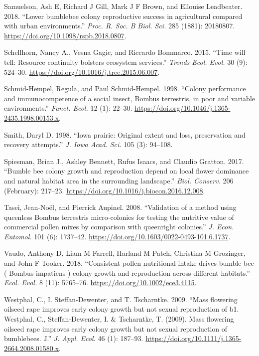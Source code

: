\documentclass[11pt,]{article}
\begin{document}
\leavevmode\hypertarget{ref-Samuelson2018}{}%
Samuelson, Ash E, Richard J Gill, Mark J F Brown, and Ellouise
Leadbeater. 2018. ``Lower bumblebee colony reproductive success in
agricultural compared with urban environments.'' \emph{Proc. R. Soc. B
Biol. Sci.} 285 (1881): 20180807.
\url{https://doi.org/10.1098/rspb.2018.0807}.

\leavevmode\hypertarget{ref-Schellhorn2015c}{}%
Schellhorn, Nancy A., Vesna Gagic, and Riccardo Bommarco. 2015. ``Time
will tell: Resource continuity bolsters ecosystem services.''
\emph{Trends Ecol. Evol.} 30 (9): 524--30.
\url{https://doi.org/10.1016/j.tree.2015.06.007}.

\leavevmode\hypertarget{ref-Schmid-Hempel1998a}{}%
Schmid-Hempel, Regula, and Paul Schmid-Hempel. 1998. ``Colony
performance and immunocompetence of a social insect, Bombus terrestris,
in poor and variable environments.'' \emph{Funct. Ecol.} 12 (1): 22--30.
\url{https://doi.org/10.1046/j.1365-2435.1998.00153.x}.

\leavevmode\hypertarget{ref-Smith1998}{}%
Smith, Daryl D. 1998. ``Iowa prairie: Original extent and loss,
preservation and recovery attempts.'' \emph{J. Iowa Acad. Sci.} 105 (3):
94--108.

\leavevmode\hypertarget{ref-Spiesman2017}{}%
Spiesman, Brian J., Ashley Bennett, Rufus Isaacs, and Claudio Gratton.
2017. ``Bumble bee colony growth and reproduction depend on local flower
dominance and natural habitat area in the surrounding landscape.''
\emph{Biol. Conserv.} 206 (February): 217--23.
\url{https://doi.org/10.1016/j.biocon.2016.12.008}.

\leavevmode\hypertarget{ref-Tasei2008}{}%
Tasei, Jean-Noël, and Pierrick Aupinel. 2008. ``Validation of a method
using queenless Bombus terrestris micro-colonies for testing the
nutritive value of commercial pollen mixes by comparison with queenright
colonies.'' \emph{J. Econ. Entomol.} 101 (6): 1737--42.
\url{https://doi.org/10.1603/0022-0493-101.6.1737}.

\leavevmode\hypertarget{ref-Vaudo2018}{}%
Vaudo, Anthony D, Liam M Farrell, Harland M Patch, Christina M
Grozinger, and John F Tooker. 2018. ``Consistent pollen nutritional
intake drives bumble bee ( Bombus impatiens ) colony growth and
reproduction across different habitats.'' \emph{Ecol. Evol.} 8 (11):
5765--76. \url{https://doi.org/10.1002/ece3.4115}.

\leavevmode\hypertarget{ref-Westphal2009a}{}%
Westphal, C., I. Steffan-Dewenter, and T. Tscharntke. 2009. ``Mass
flowering oilseed rape improves early colony growth but not sexual
reproduction of b1. Westphal, C., Steffan-Dewenter, I. \& Tscharntke, T.
(2009). Mass flowering oilseed rape improves early colony growth but not
sexual reproduction of bumblebees. J.'' \emph{J. Appl. Ecol.} 46 (1):
187--93. \url{https://doi.org/10.1111/j.1365-2664.2008.01580.x}.
\end{document}
